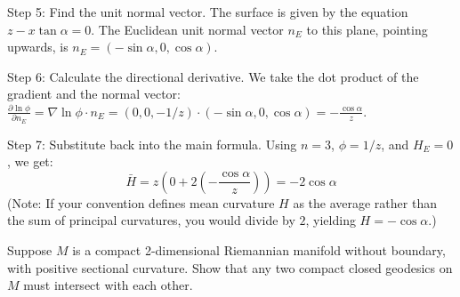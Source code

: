 \begin{solution}
Step 5: Find the unit normal vector. The surface is given by the equation $z - x \tan \alpha = 0$. The Euclidean unit normal vector $n_E$ to this plane, pointing upwards, is $n_E = (-\sin \alpha, 0, \cos \alpha)$.

Step 6: Calculate the directional derivative. We take the dot product of the gradient and the normal vector: $\frac{\partial \ln \phi}{\partial n_E} = \nabla \ln \phi \cdot n_E = (0, 0, -1/z) \cdot (-\sin \alpha, 0, \cos \alpha) = -\frac{\cos \alpha}{z}$.

Step 7: Substitute back into the main formula. Using $n=3$, $\phi = 1/z$, and $H_E=0$, we get:
\[ \bar{H} = z \left( 0 + 2 \left( -\frac{\cos \alpha}{z} \right) \right) = -2 \cos \alpha \]
(Note: If your convention defines mean curvature $H$ as the average rather than the sum of principal curvatures, you would divide by $2$, yielding $H = -\cos \alpha$.)
\end{solution}

\begin{exercise}
\label{geometry:2021:5}
Suppose $M$ is a compact 2-dimensional Riemannian manifold without boundary, with positive sectional curvature. Show that any two compact closed geodesics on $M$ must intersect with each other.
\end{exercise}

